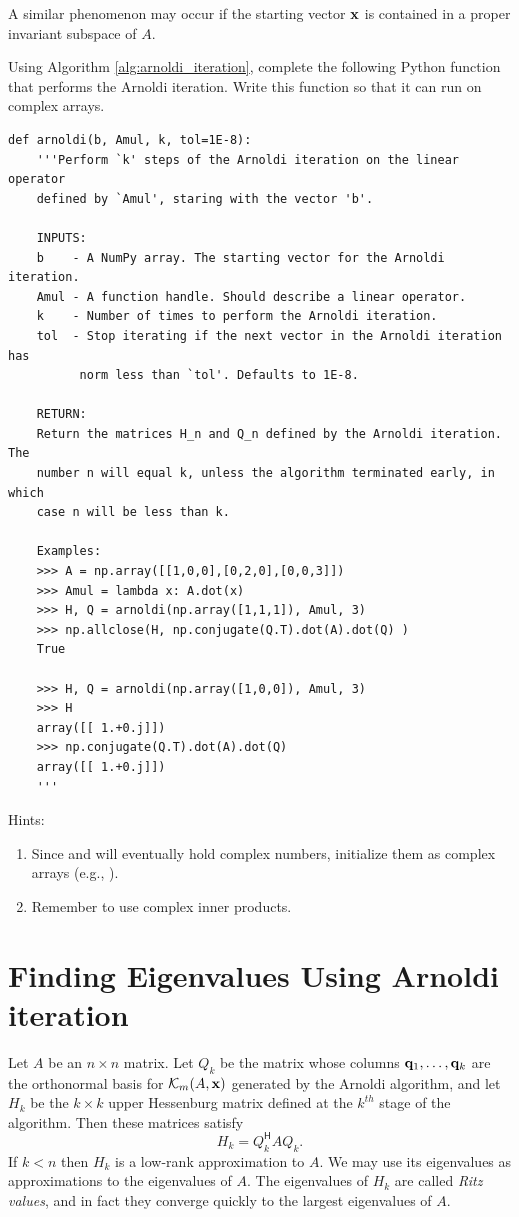 A similar phenomenon may occur if the starting vector ${\bf x}$ is contained in a proper invariant subspace of $A$.

\begin{problem}\label{prob:arnoldi}
Using Algorithm \ref{alg:arnoldi_iteration}, complete the following Python function that performs the Arnoldi iteration.
Write this function so that it can run on complex arrays.
\begin{lstlisting}
def arnoldi(b, Amul, k, tol=1E-8):
    '''Perform `k' steps of the Arnoldi iteration on the linear operator 
    defined by `Amul', staring with the vector 'b'.
    
    INPUTS:
    b    - A NumPy array. The starting vector for the Arnoldi iteration.
    Amul - A function handle. Should describe a linear operator.
    k    - Number of times to perform the Arnoldi iteration.
    tol  - Stop iterating if the next vector in the Arnoldi iteration has 
          norm less than `tol'. Defaults to 1E-8.
    
    RETURN:
    Return the matrices H_n and Q_n defined by the Arnoldi iteration. The 
    number n will equal k, unless the algorithm terminated early, in which 
    case n will be less than k.
    
    Examples:
    >>> A = np.array([[1,0,0],[0,2,0],[0,0,3]])
    >>> Amul = lambda x: A.dot(x)
    >>> H, Q = arnoldi(np.array([1,1,1]), Amul, 3)
    >>> np.allclose(H, np.conjugate(Q.T).dot(A).dot(Q) )
    True
    
    >>> H, Q = arnoldi(np.array([1,0,0]), Amul, 3)
    >>> H
    array([[ 1.+0.j]])
    >>> np.conjugate(Q.T).dot(A).dot(Q)
    array([[ 1.+0.j]])
    '''
\end{lstlisting}
Hints: 
\begin{enumerate}
\item Since  and  will eventually hold complex numbers, initialize them as complex arrays (e.g., ). 
\item Remember to use complex inner products. 
\end{enumerate}
\end{problem}



\section*{Finding Eigenvalues Using Arnoldi iteration}
Let $A$ be an $n \times n$ matrix. 
Let $Q_k$ be the matrix whose columns ${\bf q}_1, \ldots, {\bf q}_k$ are the orthonormal basis for $\mathcal{K}_m(A, {\bf x})$ generated by the Arnoldi algorithm, and
let $H_k$ be the $k\times k$ upper Hessenburg matrix defined at the $k^{th}$ stage of the algorithm.
Then these matrices satisfy
\begin{equation}\label{equ:hqa}
H_k = Q_k^{\mathsf H} A Q_k.
\end{equation}
If $k<n$ then $H_k$ is a low-rank approximation to $A$.
We may use its eigenvalues as approximations to the eigenvalues of $A$.
The eigenvalues of $H_k$ are called \emph{Ritz values}, and in fact they converge quickly to the largest eigenvalues of $A$.


